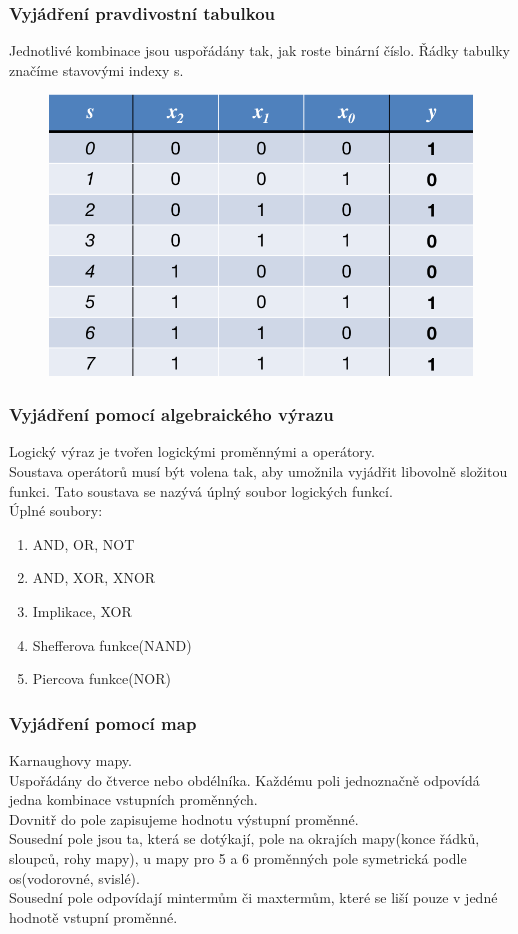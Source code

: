 \subsubsection{Vyjádření pravdivostní tabulkou}
Jednotlivé kombinace jsou uspořádány tak, jak roste binární číslo. Řádky tabulky značíme stavovými indexy s.
\begin{figure}
    \centering
    \includegraphics[scale = 0.4]{img/PravTabulka.png}
\end{figure}

\subsubsection{Vyjádření pomocí algebraického výrazu}
Logický výraz je tvořen logickými proměnnými a operátory.\\
Soustava operátorů musí být volena tak, aby umožnila vyjádřit libovolně složitou funkci. Tato soustava se nazývá úplný soubor logických funkcí. \\
Úplné soubory:
\begin{enumerate}
    \item AND, OR, NOT
    \item AND, XOR, XNOR
    \item Implikace, XOR
    \item Shefferova funkce(NAND)
    \item Piercova funkce(NOR)
\end{enumerate}

\subsubsection{Vyjádření pomocí map}
Karnaughovy mapy.\\
Uspořádány do čtverce nebo obdélníka. Každému poli jednoznačně odpovídá jedna kombinace vstupních proměnných. \\
Dovnitř do pole zapisujeme hodnotu výstupní proměnné.\\
Sousední pole jsou ta, která se dotýkají, pole na okrajích mapy(konce řádků, sloupců, rohy mapy), u mapy pro 5 a 6 proměnných pole symetrická podle os(vodorovné, svislé).\\
Sousední pole odpovídají mintermům či maxtermům, které se liší pouze v jedné hodnotě vstupní proměnné.\\

